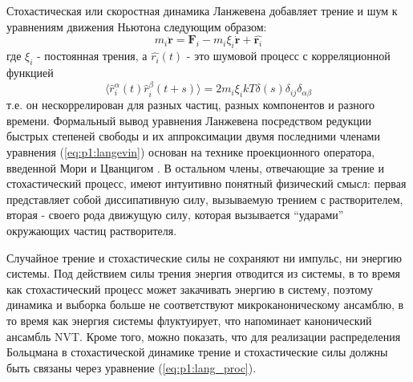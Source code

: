     
    Стохастическая или скоростная динамика Ланжевена добавляет трение и шум к уравнениям движения Ньютона следующим образом:
\begin{equation}
   m_i \ddot{{\mathbf r}}={\mathbf F}_i - m_i \xi_i \dot{{\mathbf r}} + \hat{{\mathbf r}_i}
   \label{eq:p1:langevin}
\end{equation}
    где $\xi_i$ - постоянная трения, а $\hat{r_i}(t)$ - это шумовой процесс с корреляционной функцией
\begin{equation}
   \big  \langle \hat{r}_{i}^{\alpha}(t)\hat{r}_{i}^{\beta}(t+s) \big \rangle = 2m_i \xi_i kT \delta(s) \delta_{ij} \delta_{\alpha\beta}
   \label{eq:p1:lang_proc}
\end{equation}
т.е. он нескоррелирован для разных частиц, разных компонентов и разного времени. Формальный вывод уравнения Ланжевена посредством редукции быстрых степеней свободы и их аппроксимации двумя последними членами уравнения (\ref{eq:p1:langevin}) основан на технике проекционного оператора, введенной Мори и Цванцигом \cite{zwanzig_nonequilibrium_2001}. В остальном члены, отвечающие за трение и стохастический процесс, имеют интуитивно понятный физический смысл: первая представляет собой диссипативную силу, вызываемую трением с растворителем, вторая - своего рода движущую силу, которая вызывается ``ударами'' окружающих частиц растворителя.

Случайное трение и стохастические силы не сохраняют ни импульс, ни энергию системы. Под действием силы трения энергия отводится из системы, в то время как стохастический процесс может закачивать энергию в систему, поэтому динамика и выборка больше не соответствуют микроканоническому ансамблю, в то время как энергия системы флуктуирует, что напоминает канонический ансамбль NVT. Кроме того, можно показать, что для реализации распределения Больцмана в стохастической динамике трение и стохастические силы должны быть связаны через уравнение (\ref{eq:p1:lang_proc}).
        

